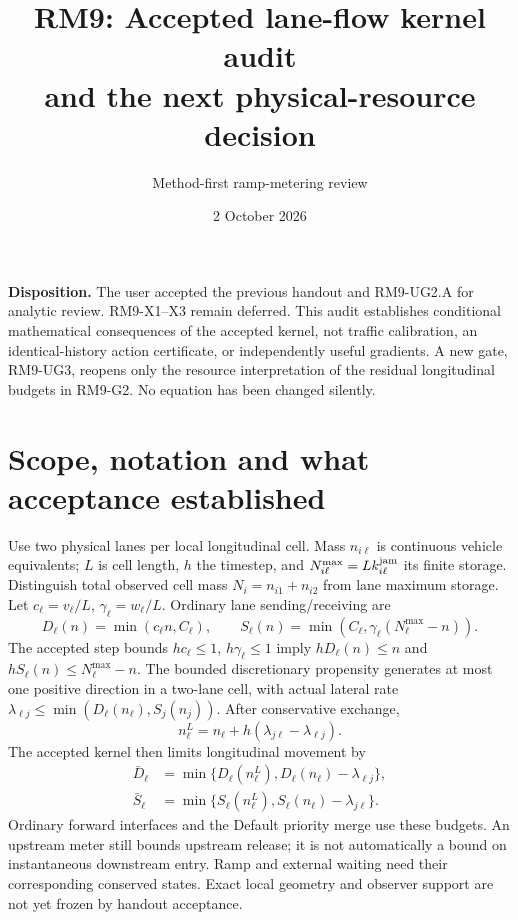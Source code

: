 \documentclass[10pt,a4paper]{article}
\title{RM9: Accepted lane-flow kernel audit\\and the next physical-resource decision}
\author{Method-first ramp-metering review}
\date{2 October 2026}
\begin{document}
\maketitle
\noindent\textbf{Disposition.} The user accepted the previous handout and
RM9-UG2.A for analytic review. RM9-X1--X3 remain deferred. This audit establishes
conditional mathematical consequences of the accepted kernel, not traffic
calibration, an identical-history action certificate, or independently useful
gradients. A new gate, RM9-UG3, reopens only the resource interpretation of the
residual longitudinal budgets in RM9-G2. No equation has been changed silently.

\section{Scope, notation and what acceptance established}
Use two physical lanes per local longitudinal cell. Mass $n_{i\ell}$ is continuous
vehicle equivalents; $L$ is cell length, $h$ the timestep, and
$N^{\max}_{i\ell}=L k^{\rm jam}_{i\ell}$ its finite storage. Distinguish total
observed cell mass $N_i=n_{i1}+n_{i2}$ from lane maximum storage.
Let $c_\ell=v_\ell/L$, $\gamma_\ell=w_\ell/L$. Ordinary lane sending/receiving are
\begin{equation}
 D_\ell(n)=\min(c_\ell n,C_\ell),\qquad
 S_\ell(n)=\min(C_\ell,\gamma_\ell(N^{\max}_\ell-n)).
\end{equation}
The accepted step bounds $h c_\ell\leq1$, $h\gamma_\ell\leq1$ imply
$hD_\ell(n)\leq n$ and $hS_\ell(n)\leq N^{\max}_\ell-n$.
The bounded discretionary propensity generates at most one positive direction
in a two-lane cell, with actual lateral rate
$\lambda_{\ell j}\leq\min(D_\ell(n_\ell),S_j(n_j))$.
After conservative exchange,
\begin{equation}
 n_\ell^L=n_\ell+h(\lambda_{j\ell}-\lambda_{\ell j}).
\end{equation}
The accepted kernel then limits longitudinal movement by
\begin{align}
 \bar D_\ell&=\min\{D_\ell(n_\ell^L),D_\ell(n_\ell)-\lambda_{\ell j}\},\\
 \bar S_\ell&=\min\{S_\ell(n_\ell^L),S_\ell(n_\ell)-\lambda_{j\ell}\}.
 \label{eq:residual}
\end{align}
Ordinary forward interfaces and the Default priority merge use these budgets.
An upstream meter still bounds upstream release; it is not automatically a
bound on instantaneous downstream entry. Ramp and external waiting need their
corresponding conserved states. Exact local geometry and observer support are
not yet frozen by handout acceptance.
\end{document}
